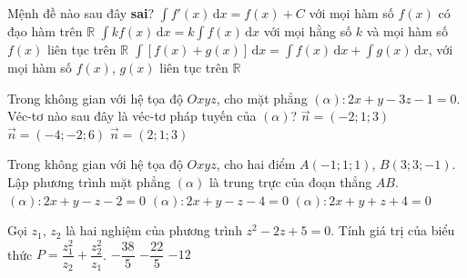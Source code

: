 \begin{ex}%
Mệnh đề nào sau đây \textbf{sai}?
{$\displaystyle\int f'(x)\mathrm{\, d}x=f(x)+C$ với mọi hàm số $f(x)$ có đạo hàm trên $\mathbb{R}$}
{\True $\displaystyle\int kf(x)\mathrm{\, d}x=k\displaystyle\int f(x)\mathrm{\, d}x$ với mọi hằng số $k$ và mọi hàm số $f(x)$ liên tục trên $\mathbb{R}$}
{$\displaystyle\int\left[f(x)+g(x)\right]\mathrm{\, d}x=\displaystyle\int f(x)\mathrm{\, d}x+\displaystyle\int g(x)\mathrm{\, d}x$, với mọi hàm số $f(x)$, $g(x)$ liên tục trên $\mathbb{R}$}
\end{ex}

\begin{ex}%
Trong không gian với hệ tọa độ $Oxyz$, cho mặt phẳng $(\alpha)\colon 2x+y-3z-1=0$. Véc-tơ nào sau đây là véc-tơ pháp tuyến của $(\alpha)$?
{$\overrightarrow{n}=(-2;1;3)$}
{\True $\overrightarrow{n}=(-4;-2;6)$}
{$\overrightarrow{n}=(2;1;3)$}
\end{ex}

\begin{ex}%
Trong không gian với hệ tọa độ $Oxyz$, cho hai điểm $A(-1;1;1)$, $B(3;3;-1)$. Lập phương trình mặt phẳng $(\alpha)$ là trung trực của đoạn thẳng $AB$.
{$(\alpha)\colon 2x+y-z-2=0$}
{\True $(\alpha)\colon 2x+y-z-4=0$}
{$(\alpha)\colon 2x+y+z+4=0$}
\end{ex}

\begin{ex}%
Gọi $z_1$, $z_2$ là hai nghiệm của phương trình $z^2-2z+5=0$. Tính giá trị của biểu thức $P=\dfrac{z_1^2}{z_2}+\dfrac{z_2^2}{z_1}$.
{$-\dfrac{38}{5}$}
{\True $-\dfrac{22}{5}$}
{$-12$}
\end{ex}

